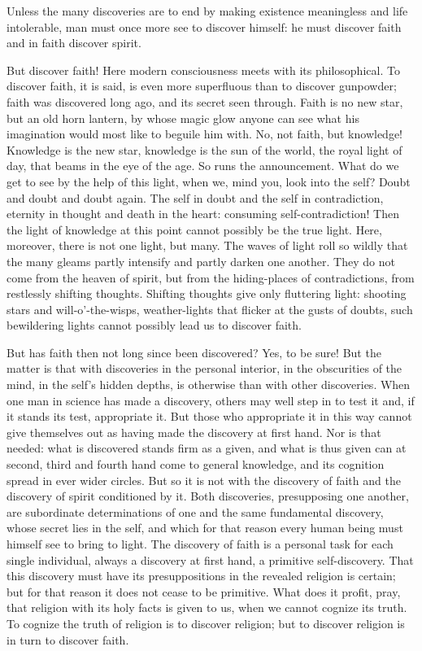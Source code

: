 \documentclass[12pt,a4paper,openany]{book}
\newcommand{\opage}[1]{\marginnote{\footnotesize\textit{[#1]}}}
\begin{document}
Unless the many discoveries are to end by making existence meaningless and life intolerable, man must once more see to
discover himself: he must discover faith and in faith discover spirit.

But discover faith! Here modern consciousness meets with its philosophical. To discover faith, it is said, is even more
superfluous than to discover gunpowder; faith was discovered long ago, and its secret seen through. Faith is no new star, but
an old horn lantern, by whose magic glow anyone can see what his imagination would most like to beguile him with. No, not
faith, but knowledge! Knowledge is the new star, knowledge is the sun of the world, the royal light of day, that beams in the
eye of the age. So runs the announcement. What do we get to see by the help of this light, when we, mind you, look into the
self? Doubt and doubt and doubt again. The self in doubt and the self in contradiction, eternity in thought and death in the
heart: consuming self-contradiction! Then the light of knowledge at this point cannot possibly be the true light. Here, moreover,
there is not one light, but many. The waves of light roll so wildly that the many gleams partly intensify and partly darken one
another. They do not come from the heaven of spirit, but from the hiding-places of contradictions, from restlessly shifting
thoughts. Shifting thoughts give only fluttering light: shooting stars and will-o'-the-wisps, weather-lights that flicker at
the gusts of doubts, such bewildering lights cannot possibly lead us to discover faith.

But has faith then not long since been discovered? Yes, to be sure!
But the matter is that with discoveries in the personal
interior, in the obscurities of the mind, in the self's hidden
\setcounter{footnote}{0}%
\opage{41}depths, is otherwise than with other discoveries. When one man in science has made a discovery, others may well step in to
test it and, if it stands its test, appropriate it. But those who appropriate it in this way cannot give themselves out as
having made the discovery at first hand. Nor is that needed: what is discovered stands firm as a given, and what is thus
given can at second, third and fourth hand come to general knowledge, and its cognition spread in ever wider circles. But so
it is not with the discovery of faith and the discovery of spirit conditioned by it. Both discoveries, presupposing one
another, are subordinate determinations of one and the same fundamental discovery, whose secret lies in the self, and which
for that reason every human being must himself see to bring to light. The discovery of faith is a personal task for each
single individual, always a discovery at first hand, a primitive self-discovery. That this discovery must have its
presuppositions in the revealed religion is certain; but for that reason it does not cease to be primitive. What does it
profit, pray, that religion with its holy facts is given to us, when we cannot cognize its truth. To cognize the truth of
religion is to discover religion; but to discover religion is in turn to discover faith.
\end{document}
